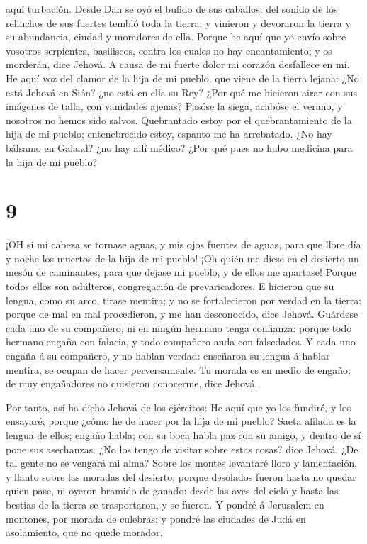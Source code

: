 aquí turbación.  Desde Dan se oyó el bufido de sus
caballos: del sonido de los relinchos de sus fuertes tembló toda la
tierra; y vinieron y devoraron la tierra y su abundancia, ciudad y
moradores de ella.  Porque he aquí que yo envío sobre
vosotros serpientes, basiliscos, contra los cuales no hay encantamiento;
y os morderán, dice Jehová.  A causa de mi fuerte dolor mi
corazón desfallece en mí.  He aquí voz del clamor de la
hija de mi pueblo, que viene de la tierra lejana: ¿No está Jehová en
Sión? ¿no está en ella su Rey? ¿Por qué me hicieron airar con sus
imágenes de talla, con vanidades ajenas?  Pasóse la siega,
acabóse el verano, y nosotros no hemos sido salvos. 
Quebrantado estoy por el quebrantamiento de la hija de mi pueblo;
entenebrecido estoy, espanto me ha arrebatado.  ¿No hay
bálsamo en Galaad? ¿no hay allí médico? ¿Por qué pues no hubo medicina
para la hija de mi pueblo?

\hypertarget{section-8}{%
\section{9}\label{section-8}}

 ¡OH si mi cabeza se tornase aguas, y mis ojos fuentes de
aguas, para que llore día y noche los muertos de la hija de mi pueblo!
 ¡Oh quién me diese en el desierto un mesón de caminantes,
para que dejase mi pueblo, y de ellos me apartase! Porque todos ellos
son adúlteros, congregación de prevaricadores.  E hicieron
que su lengua, como su arco, tirase mentira; y no se fortalecieron por
verdad en la tierra: porque de mal en mal procedieron, y me han
desconocido, dice Jehová.  Guárdese cada uno de su
compañero, ni en ningún hermano tenga confianza: porque todo hermano
engaña con falacia, y todo compañero anda con falsedades.  Y
cada uno engaña á su compañero, y no hablan verdad: enseñaron su lengua
á hablar mentira, se ocupan de hacer perversamente.  Tu
morada es en medio de engaño; de muy engañadores no quisieron conocerme,
dice Jehová.

 Por tanto, así ha dicho Jehová de los ejércitos: He aquí
que yo los fundiré, y los ensayaré; porque ¿cómo he de hacer por la hija
de mi pueblo?  Saeta afilada es la lengua de ellos; engaño
habla; con su boca habla paz con su amigo, y dentro de sí pone sus
asechanzas.  ¿No los tengo de visitar sobre estas cosas?
dice Jehová. ¿De tal gente no se vengará mi alma?  Sobre
los montes levantaré lloro y lamentación, y llanto sobre las moradas del
desierto; porque desolados fueron hasta no quedar quien pase, ni oyeron
bramido de ganado: desde las aves del cielo y hasta las bestias de la
tierra se trasportaron, y se fueron.  Y pondré á Jerusalem
en montones, por morada de culebras; y pondré las ciudades de Judá en
asolamiento, que no quede morador.

